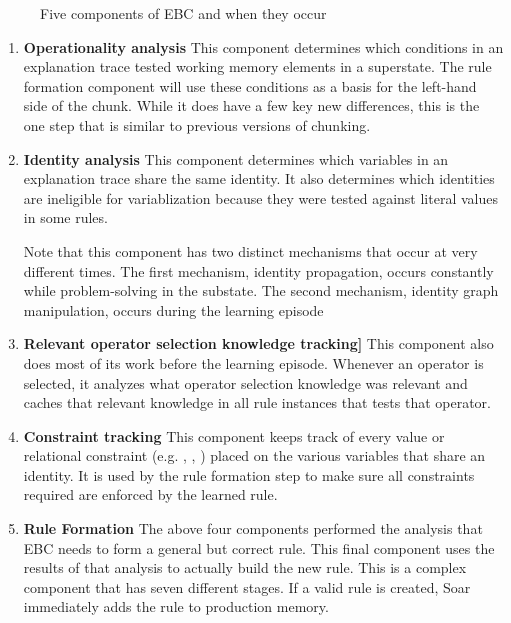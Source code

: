 \begin{figure}
	\caption{Five components of EBC and when they occur}
	\label{fig:chunking-ebc-components}
\end{figure}

\begin{enumerate}
	\item \textbf{Operationality analysis} \hfill
	This component determines which conditions in an explanation trace tested working memory elements in a superstate.  The rule formation component will use these conditions as a basis for the left-hand side of the chunk.  While it does have a few key new differences, this is the one step that is similar to previous versions of chunking.

	\item \textbf{Identity analysis} \hfill
	This component determines which variables in an explanation trace share the same identity.  It also determines which identities are ineligible for variablization because they were tested against literal values in some rules.  

	Note that this component has two distinct mechanisms that occur at very different times.  The first mechanism, identity propagation, occurs constantly while problem-solving in the substate.  The second mechanism, identity graph manipulation, occurs during the learning episode

	\item \textbf{Relevant operator selection knowledge tracking]} \hfill
	This component also does most of its work before the learning episode.  Whenever an operator is selected, it analyzes what operator selection knowledge was relevant and caches that relevant knowledge in all rule instances that tests that operator. 

	\item \textbf{Constraint tracking} \hfill
	This component keeps track of every value or relational constraint (e.g. , , ) placed on the various variables that share an identity.  It is used by the rule formation step to make sure all constraints required are enforced by the learned rule.

	\item \textbf{Rule Formation} \hfill
	The above four components performed the analysis that EBC needs to form a general but correct rule.  This final component uses the results of that analysis to actually build the new rule.  This is a complex component that has seven different stages.  If a valid rule is created, Soar immediately adds the rule to production memory.
\end{enumerate}

